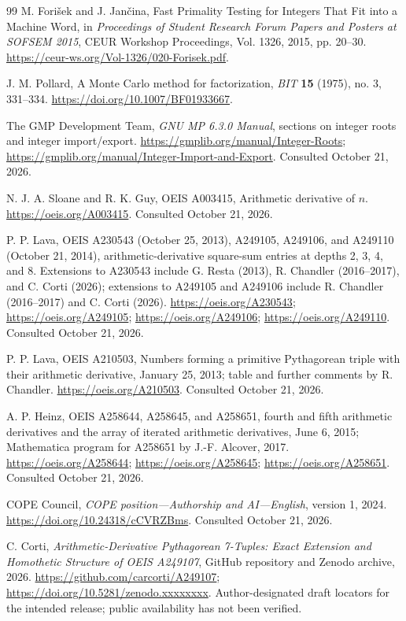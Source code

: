 \documentclass[11pt,a4paper]{article}
\theoremstyle{definition}
\theoremstyle{remark}
\begin{document}
\begin{thebibliography}{99}
M. Fori\v{s}ek and J. Jan\v{c}ina, Fast Primality Testing for Integers That
Fit into a Machine Word, in \emph{Proceedings of Student Research Forum
Papers and Posters at SOFSEM 2015}, CEUR Workshop Proceedings,
Vol. 1326, 2015, pp. 20--30.
\url{https://ceur-ws.org/Vol-1326/020-Forisek.pdf}.

J. M. Pollard, A Monte Carlo method for factorization,
\emph{BIT} \textbf{15} (1975), no. 3, 331--334.
\url{https://doi.org/10.1007/BF01933667}.

The GMP Development Team, \emph{GNU MP 6.3.0 Manual}, sections on integer
roots and integer import/export.
\url{https://gmplib.org/manual/Integer-Roots};
\url{https://gmplib.org/manual/Integer-Import-and-Export}.
Consulted October 21, 2026.

N. J. A. Sloane and R. K. Guy, OEIS A003415, Arithmetic derivative of $n$.
\url{https://oeis.org/A003415}. Consulted October 21, 2026.

P. P. Lava, OEIS A230543 (October 25, 2013), A249105, A249106, and A249110
(October 21, 2014), arithmetic-derivative square-sum entries at depths
2, 3, 4, and 8. Extensions to A230543 include G. Resta (2013),
R. Chandler (2016--2017), and C. Corti (2026); extensions to A249105 and
A249106 include R. Chandler (2016--2017) and C. Corti (2026).
\url{https://oeis.org/A230543}; \url{https://oeis.org/A249105};
\url{https://oeis.org/A249106}; \url{https://oeis.org/A249110}.
Consulted October 21, 2026.

P. P. Lava, OEIS A210503, Numbers forming a primitive Pythagorean triple
with their arithmetic derivative, January 25, 2013; table and further
comments by R. Chandler.
\url{https://oeis.org/A210503}. Consulted October 21, 2026.

A. P. Heinz, OEIS A258644, A258645, and A258651, fourth and fifth
arithmetic derivatives and the array of iterated arithmetic derivatives,
June 6, 2015; Mathematica program for A258651 by J.-F. Alcover, 2017.
\url{https://oeis.org/A258644}; \url{https://oeis.org/A258645};
\url{https://oeis.org/A258651}. Consulted October 21, 2026.

COPE Council, \emph{COPE position---Authorship and AI---English},
version 1, 2024. \url{https://doi.org/10.24318/cCVRZBms}.
Consulted October 21, 2026.

C. Corti, \emph{Arithmetic-Derivative Pythagorean 7-Tuples: Exact Extension
and Homothetic Structure of OEIS A249107}, GitHub repository and Zenodo archive,
2026. \url{https://github.com/carcorti/A249107};
\url{https://doi.org/10.5281/zenodo.xxxxxxxx}.
Author-designated draft locators for the intended release; public
availability has not been verified.

\end{thebibliography}
\end{document}
